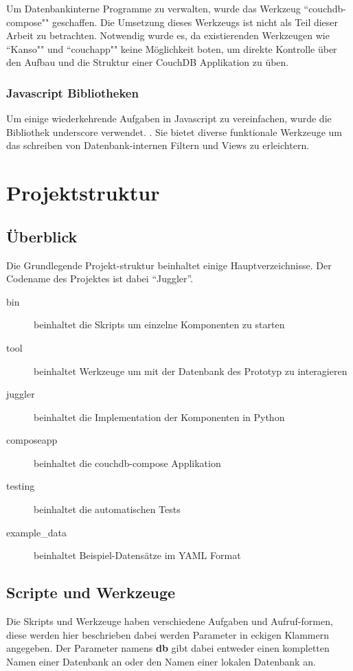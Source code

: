Um Datenbankinterne Programme zu verwalten,
wurde das Werkzeug ``couchdb-compose"" \cite{couchdb:compose} geschaffen.
Die Umsetzung dieses Werkzeugs ist nicht als Teil dieser Arbeit zu betrachten.
Notwendig wurde es, da existierenden Werkzeugen wie ``Kanso"" und ``couchapp""
keine Möglichkeit boten, um direkte Kontrolle über den Aufbau und die Struktur 
einer CouchDB Applikation zu üben.

\subsubsection{Javascript Bibliotheken}

Um einige wiederkehrende Aufgaben in Javascript zu vereinfachen,
wurde die Bibliothek underscore verwendet. \cite{javascript:underscore}.
Sie bietet diverse funktionale Werkzeuge um das schreiben
von Datenbank-internen Filtern und Views zu erleichtern.


\section{Projektstruktur}
\subsection{Überblick}

Die Grundlegende Projekt-struktur beinhaltet einige Hauptverzeichnisse.
Der Codename des Projektes ist dabei ``Juggler''.


\begin{description}
    \item[bin] beinhaltet die Skripts um einzelne Komponenten zu starten
    \item[tool] beinhaltet Werkzeuge um mit der Datenbank des Prototyp zu interagieren
    \item[juggler] beinhaltet die Implementation der Komponenten in Python
    \item[composeapp] beinhaltet die couchdb-compose Applikation
    \item[testing] beinhaltet die automatischen Tests
    \item[example\_data] beinhaltet Beispiel-Datensätze im YAML Format
\end{description}

\subsection{Scripte und Werkzeuge}
Die Skripts und Werkzeuge haben verschiedene Aufgaben und Aufruf-formen,
diese werden hier beschrieben dabei werden Parameter in eckigen Klammern angegeben.
Der Parameter namens \textbf{db} gibt dabei entweder einen kompletten Namen einer  Datenbank an oder den Namen einer lokalen Datenbank an.


